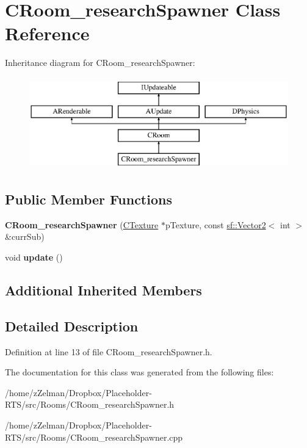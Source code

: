 \hypertarget{classCRoom__researchSpawner}{\section{C\-Room\-\_\-research\-Spawner Class Reference}
\label{classCRoom__researchSpawner}
}
Inheritance diagram for C\-Room\-\_\-research\-Spawner\-:\begin{figure}[H]
\begin{center}
\leavevmode
\includegraphics[height=4.000000cm]{classCRoom__researchSpawner}
\end{center}
\end{figure}
\subsection*{Public Member Functions}
\begin{DoxyCompactItemize}
\item 
\hypertarget{classCRoom__researchSpawner_a4ee41a903b9bdd6c7a559bf72d78b135}{{\bfseries C\-Room\-\_\-research\-Spawner} (\hyperlink{classCTexture}{C\-Texture} $\ast$p\-Texture, const \hyperlink{classsf_1_1Vector2}{sf\-::\-Vector2}$<$ int $>$ \&curr\-Sub)}\label{classCRoom__researchSpawner_a4ee41a903b9bdd6c7a559bf72d78b135}

\item 
\hypertarget{classCRoom__researchSpawner_ab565078eeec1d2dded6f19a91e322665}{void {\bfseries update} ()}\label{classCRoom__researchSpawner_ab565078eeec1d2dded6f19a91e322665}

\end{DoxyCompactItemize}
\subsection*{Additional Inherited Members}


\subsection{Detailed Description}


Definition at line 13 of file C\-Room\-\_\-research\-Spawner.\-h.



The documentation for this class was generated from the following files\-:\begin{DoxyCompactItemize}
\item 
/home/z\-Zelman/\-Dropbox/\-Placeholder-\/\-R\-T\-S/src/\-Rooms/C\-Room\-\_\-research\-Spawner.\-h\item 
/home/z\-Zelman/\-Dropbox/\-Placeholder-\/\-R\-T\-S/src/\-Rooms/C\-Room\-\_\-research\-Spawner.\-cpp\end{DoxyCompactItemize}
